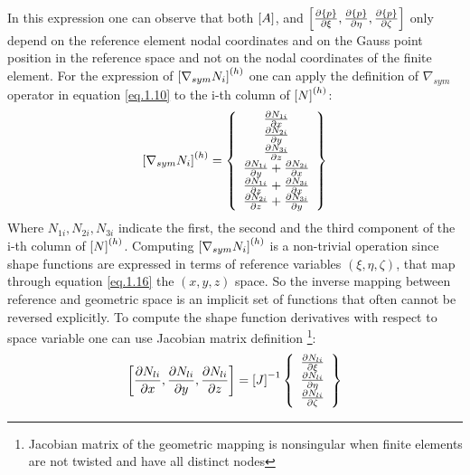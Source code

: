In this expression one can observe that both $\left[{A}\right]$, and $\left[{\frac{\partial \left\lbrace{p}\right \rbrace}{\partial \xi},\frac{\partial \left\lbrace{p}\right \rbrace}{\partial \eta},\frac{\partial \left\lbrace{p}\right \rbrace}{\partial \zeta}}\right] $ only depend on the reference element nodal coordinates and on the Gauss point position in the reference space and not on the nodal coordinates of the finite element.
For the expression of $\left[{\nabla_{sym}N_i}\right]^{(h)}$ one can apply the definition of $\nabla_{sym}$ operator in equation \ref{eq.1.10} to the i-th column of $\left[{N}\right]^{(h)}$:
\begin{equation}
	\left[{\nabla_{sym}N_i}\right]^{(h)}=\left\lbrace{\begin{array}{c}
		\frac{\partial N_{1i}}{\partial x}\\\frac{\partial N_{2i}}{\partial y}\\\frac{\partial N_{3i}}{\partial z}\\
		\frac{\partial N_{1i}}{\partial y}+\frac{\partial N_{2i}}{\partial x}\\\frac{\partial N_{1i}}{\partial z}+\frac{\partial N_{3i}}{\partial x}\\\frac{\partial N_{2i}}{\partial z}+\frac{\partial N_{3i}}{\partial y}
		\end{array}}\right \rbrace
\end{equation}
Where $N_{1i},N_{2i},N_{3i}$ indicate the first, the second and the third component of the i-th column of  $\left[{N}\right]^{(h)}$.
Computing $\left[{\nabla_{sym}N_i}\right]^{(h)}$ is a non-trivial operation since shape functions are expressed in terms of reference variables $(\xi,\eta,\zeta)$, that map through equation \ref{eq.1.16} the $(x,y,z)$ space. So the inverse mapping between reference and geometric space is an implicit set of functions that often cannot be reversed explicitly. To compute the shape function derivatives with respect to space variable one can use Jacobian matrix definition \footnote{Jacobian matrix of the geometric mapping is nonsingular when finite elements are not twisted and have all distinct nodes}:
\begin{equation}
\left[{\frac{\partial N_{li}}{\partial x},\frac{\partial N_{li}}{\partial y},\frac{\partial N_{li}}{\partial z}}\right]= 
\left[{J}\right]^{-1}\left\lbrace{\begin{array}{c}
	\frac{\partial N_{li}}{\partial \xi}\\\frac{\partial N_{li}}{\partial \eta}\\\frac{\partial N_{li}}{\partial \zeta}\end{array}}\right \rbrace 
\end{equation}
